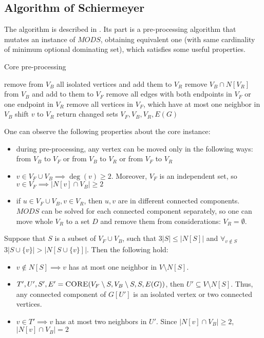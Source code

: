 \subsection{Algorithm of Schiermeyer}
The algorithm is described in \cite{SCHIERMEYER20083291}. Its part is a pre-processing algorithm that mutates an instance of $MODS$, obtaining equivalent one (with same cardinality of minimum optional dominating set), which satisfies some useful properties.
\begin{algorithm}
\caption{Core pre-processing}
\label{alg:core}
\begin{algorithmic}[1]
 
\Do
\State remove from $V_B$ all isolated vertices and add them to $V_R$
\State remove $V_B \cap N[V_R]$ from $V_B$ and add to them to $V_F$
\State remove all edges with both endpoints in $V_F$ or one endpoint in $V_R$
\State remove all vertices in $V_F$, which have at most one neighbor in $V_B$
 shift $v$ to $V_R$
\EndWhile
{}
\State return changed sets $V_F, V_B, V_R, E(G)$
\EndProcedure
\end{algorithmic}
\end{algorithm}

One can observe the following properties about the core instance:
\begin{itemize}
    \item during pre-processing, any vertex can be moved only in the following ways: from $V_B$ to $V_F$ or from $V_B$ to $V_R$ or from $V_F$ to $V_R$
    \item $v \in V_F \cup V_B \implies \deg(v) \geq 2$. Moreover, $V_F$ is an independent set, so $v\in V_F \implies |N[v] \cap V_B| \geq 2$ 
    \item if $u \in V_F \cup V_B, v\in V_R$, then $u,v$ are in different connected components. $MODS$ can be solved for each connected component separately, so one can move whole $V_R$ to a set $D$ and remove them from considerations: $V_R = \emptyset$.
\end{itemize}
Suppose that $S$ is a subset of $V_F \cup V_B$, such that $3|S| \leq |N[S]|$ and $\forall_{v\notin S}$ $3|S \cup \{v\}| > |N[S \cup \{v\}]|$. Then the following hold:
\begin{itemize}
    \item $v \notin N[S] \implies v$ has at most one neighbor in $V \setminus N[S]$.
    \item $T', U', S', E' = \textsc{CORE}(V_F \setminus S, V_B\setminus S, S, E(G))$, then $U' \subseteq V \setminus N[S]$. Thus, any connected component of $G[U']$ is an isolated vertex or two connected vertices.
    \item $v \in T' \implies v$ has at most two neighbors in $U'$. Since $|N[v] \cap V_B| \geq 2$, $|N[v] \cap V_B| = 2$
\end{itemize}


